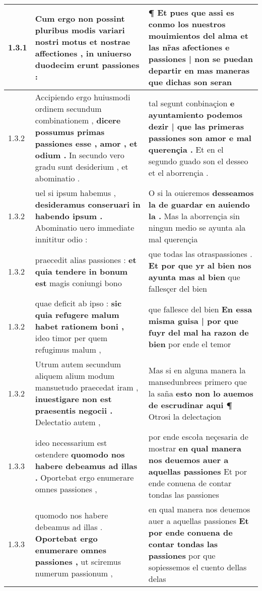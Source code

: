 \begin{tabular}{|p{1cm}|p{6.5cm}|p{6.5cm}|}
1.3.1 & Cum ergo non possint \textbf{ pluribus modis variari nostri motus et nostrae affectiones , } in uniuerso duodecim erunt passiones : & ¶ Et pues que assi es conmo los nuestros mouimientos del alma \textbf{ et las nr̃as afectiones e passiones | non se puedan departir en mas maneras } que dichas son seran \\\hline
1.3.2 & Accipiendo ergo huiusmodi ordinem secundum combinationem , \textbf{ dicere possumus primas passiones esse , amor , et odium . } In secundo vero gradu sunt desiderium , et abominatio . & tal segunt conbinaçion \textbf{ e ayuntamiento podemos dezir | que las primeras passiones son amor e mal querençia . } Et en el segundo guado son el desseo et el aborrençia . \\\hline
1.3.2 & uel si ipsum habemus , \textbf{ desideramus conseruari in habendo ipsum . } Abominatio uero immediate innititur odio : & O si la ouieremos \textbf{ desseamos la de guardar en auiendo la . } Mas la aborrençia sin ningun medio se ayunta ala mal querençia \\\hline
1.3.2 & praecedit alias passiones : \textbf{ et quia tendere in bonum est } magis coniungi bono & que todas las otraspassiones . \textbf{ Et por que yr al bien nos ayunta mas al bien } que fallesçer del bien \\\hline
1.3.2 & quae deficit ab ipso : \textbf{ sic quia refugere malum habet rationem boni , } ideo timor per quem refugimus malum , & que fallesce del bien \textbf{ En essa misma guisa | por que fuyr del mal ha razon de bien } por ende el temor \\\hline
1.3.2 & Utrum autem secundum aliquem alium modum mansuetudo praecedat iram , \textbf{ inuestigare non est praesentis negocii . } Delectatio autem , & Mas si en alguna manera la mansedunbrees primero que la saña \textbf{ esto non lo auemos de escrudinar aqui ¶ } Otrosi la delectaçion \\\hline
1.3.3 & ideo necessarium est ostendere \textbf{ quomodo nos habere debeamus ad illas . } Oportebat ergo enumerare omnes passiones , & por ende escoła neçesaria de mostrar \textbf{ en qual manera nos deuemos auer a aquellas passiones } Et por ende conuena de contar tondas las passiones \\\hline
1.3.3 & quomodo nos habere debeamus ad illas . \textbf{ Oportebat ergo enumerare omnes passiones , } ut sciremus numerum passionum , & en qual manera nos deuemos auer a aquellas passiones \textbf{ Et por ende conuena de contar tondas las passiones } por que sopiessemos el cuento dellas delas \\\hline

\end{tabular}
